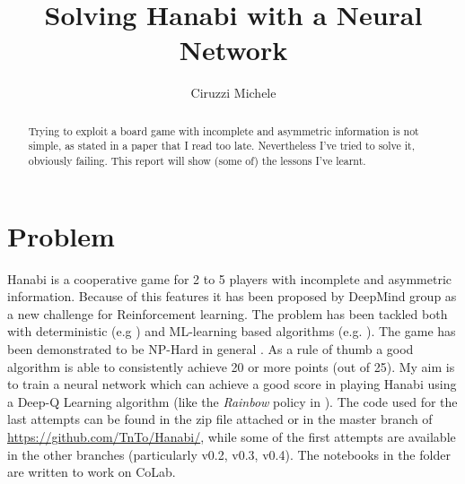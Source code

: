 \documentclass[]{article}
\title{Solving Hanabi with a Neural Network}
\author{Ciruzzi Michele}
\begin{document}
\maketitle

\begin{abstract}
	Trying to exploit a board game with incomplete and asymmetric information is not simple, as stated in a paper \cite{BARD2020103216} that I read too late. Nevertheless I've tried to solve it, obviously failing. This report will show (some of) the lessons I've learnt. 
\end{abstract}

\section{Problem}
Hanabi is a cooperative game for 2 to 5 players with incomplete and asymmetric information.
Because of this features it has been proposed by DeepMind group \parencite{BARD2020103216} as a new challenge for Reinforcement learning.
The problem has been tackled both with deterministic (e.g \cite{Cox2015}) and ML-learning based algorithms (e.g. \cite{Lerer2019}).
The game has been demonstrated to be NP-Hard in general \parencite{Baffier2016}.
As a rule of thumb a good algorithm is able to consistently achieve 20 or more points (out of 25).
My aim is to train a neural network which can achieve a good score in playing Hanabi using a Deep-Q Learning algorithm \cite{Mnih2015} (like the \textit{Rainbow} policy in \cite{BARD2020103216}).
The code used for the last attempts can be found in the zip file attached or in the master branch of \url{https://github.com/TnTo/Hanabi/}, while some of the first attempts are available in the other branches (particularly v0.2, v0.3, v0.4). The notebooks in the folder are written to work on CoLab.

\end{document}
